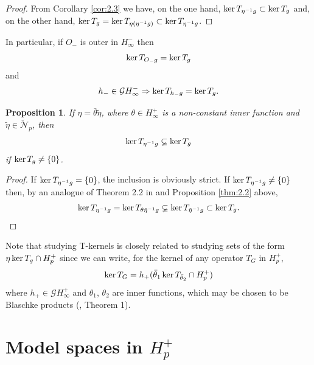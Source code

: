 \documentclass[11pt]{article}
\def\ker{\mathop{\rm ker}\nolimits}
\newtheorem{prop}[thm]{Proposition}
\numberwithin{equation}{section}
\def\beginpf{\begin{proof}}
\def\endpf{\end{proof}}
\begin{document}
\beginpf From Corollary \ref{cor:2.3} we have, on the one hand, $\ker T_{\eta^{-1}g}\subset\ker T_g$ and, on the other hand, $\ker T_g=\ker T_{\eta (\eta^{-1}g)}\subset \ker T_{\eta^{-1}g}$.
\endpf

In particular, if $ {O}_{-}$ is outer in $H_\infty^-$ then
\begin{equation}\label{21.9}
\ker T_{ {O}_-g} = \ker T_g
\end{equation}
and
\begin{equation}\label{21.10}
h_- \in \mathcal{G}H_\infty^- \Rightarrow \ker T_{h_-g}=\ker T_g.
\end{equation}

\begin{prop} If $\eta= \bar{\theta} \tilde{\eta}$, where $\theta\in H_\infty^+$ is a non-constant inner function and $\tilde{\eta} \in \widetilde{\mathcal{N}}_p$, then
\[\ker T_{\eta^{-1}g}\varsubsetneq \ker T_g\]
if $\ker T_g \neq \{0\}$.
\end{prop}

\beginpf If $\ker T_{\eta^{-1}g}=\{0\}$, the inclusion is obviously strict. If $\ker T_{\eta^{-1}g}\neq\{0\}$ then, by an analogue of Theorem 2.2 in \cite{CP14} and Proposition \ref{thm:2.2} above,
\[\ker T_{\eta^{-1}g}=\ker T_{\theta\tilde{\eta}^{-1}g}\varsubsetneq \ker T_{\tilde{\eta}^{-1}g} \subset \ker T_g.\]
\endpf

Note that studying T-kernels is closely related to studying sets of the form $\eta \ker T_g \cap H_p^+$ since we can write, for the kernel of any operator $T_G$ in $H_p^+$,
\begin{equation}\label{21.11}
\ker T_G=h_+ (\bar{\theta}_1\ker T_{\bar{\theta}_2} \cap H_p^+)
\end{equation}
where $h_+ \in \mathcal{G}H_\infty^+$ and $\theta_1$, $\theta_2$ are inner functions, which may be chosen to be Blaschke products (\cite{Dyakonov}, Theorem 1).








\section{Model spaces in $H_p^+$}\label{sec:modelspaces}
\label{sec:3}
\end{document}
